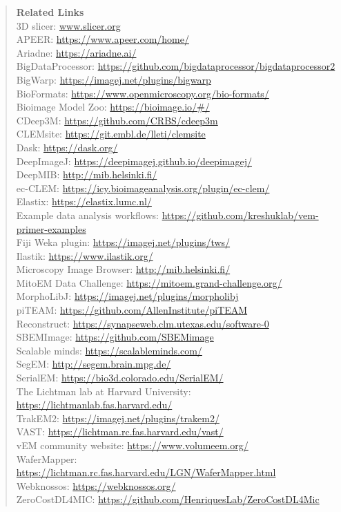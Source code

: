 \documentclass{article}
\begin{document}
\begin{quote}
\noindent\textbf{Related Links}\\
3D slicer: \url{www.slicer.org}\\
APEER: \url{https://www.apeer.com/home/}\\
Ariadne: \url{https://ariadne.ai/}\\
BigDataProcessor: \url{https://github.com/bigdataprocessor/bigdataprocessor2}\\
BigWarp: \url{https://imagej.net/plugins/bigwarp}\\
BioFormats: \url{https://www.openmicroscopy.org/bio-formats/}\\
Bioimage Model Zoo: \url{https://bioimage.io/#/}\\
CDeep3M: \url{https://github.com/CRBS/cdeep3m}\\
CLEMsite: \url{https://git.embl.de/lleti/clemsite}\\
Dask: \url{https://dask.org/}\\
DeepImageJ: \url{https://deepimagej.github.io/deepimagej/}\\
DeepMIB: \url{http://mib.helsinki.fi/}\\
ec-CLEM: \url{https://icy.bioimageanalysis.org/plugin/ec-clem/}\\
Elastix: \url{https://elastix.lumc.nl/}\\
Example data analysis workflows: \url{https://github.com/kreshuklab/vem-primer-examples}\\
Fiji Weka plugin: \url{https://imagej.net/plugins/tws/}\\
Ilastik: \url{https://www.ilastik.org/}\\
Microscopy Image Browser: \url{http://mib.helsinki.fi/}\\
MitoEM Data Challenge: \url{https://mitoem.grand-challenge.org/}\\
MorphoLibJ: \url{https://imagej.net/plugins/morpholibj}\\
piTEAM: \url{https://github.com/AllenInstitute/piTEAM}\\
Reconstruct: \url{https://synapseweb.clm.utexas.edu/software-0}\\
SBEMImage: \url{https://github.com/SBEMimage}\\
Scalable minds: \url{https://scalableminds.com/}\\
SegEM: \url{http://segem.brain.mpg.de/}\\
SerialEM: \url{https://bio3d.colorado.edu/SerialEM/}\\
The Lichtman lab at Harvard University: \url{https://lichtmanlab.fas.harvard.edu/}\\
TrakEM2: \url{https://imagej.net/plugins/trakem2/}\\
VAST: \url{https://lichtman.rc.fas.harvard.edu/vast/}\\
vEM community website: \url{https://www.volumeem.org/}\\
WaferMapper: \url{https://lichtman.rc.fas.harvard.edu/LGN/WaferMapper.html}\\
Webknossos: \url{https://webknossos.org/}\\
ZeroCostDL4MIC: \url{https://github.com/HenriquesLab/ZeroCostDL4Mic}
\end{quote}
\end{document}
